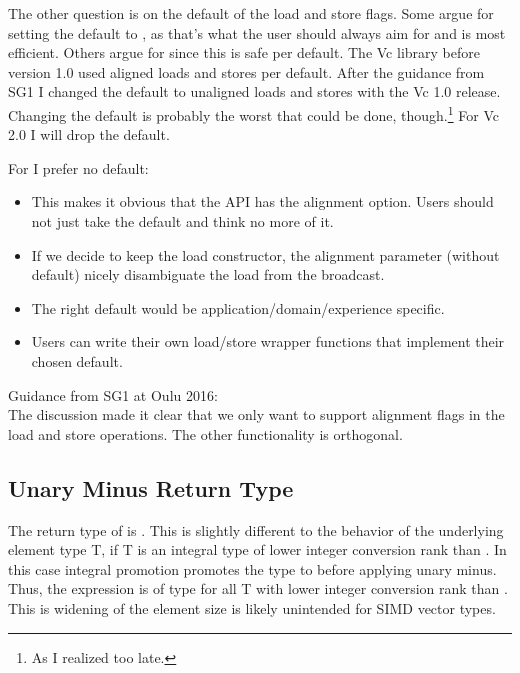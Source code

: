 The other question is on the default of the load and store flags.
Some argue for setting the default to , as that's what the user should always aim for and is most efficient.
Others argue for  since this is safe per default.
The Vc library before version 1.0 used aligned loads and stores per default.
After the guidance from SG1 I changed the default to unaligned loads and stores with the Vc 1.0 release.
Changing the default is probably the worst that could be done, though.\footnote{As I realized too late.}
For Vc 2.0 I will drop the default.

For \simd I prefer no default:
\begin{itemize}
  \item This makes it obvious that the API has the alignment option.
    Users should not just take the default and think no more of it.
  \item If we decide to keep the load constructor, the alignment parameter (without default) nicely disambiguate the load from the broadcast.
  \item The right default would be application/domain/experience specific.
  \item Users can write their own load/store wrapper functions that implement their chosen default.
\end{itemize}

Guidance from SG1 at Oulu 2016:\\
The discussion made it clear that we only want to support alignment flags in the load and store operations.
The other functionality is orthogonal.

\subsection{Unary Minus Return Type}\label{sec:unary minus}
The return type of  is .
This is slightly different to the behavior of the underlying element type \type T, if \type T is an integral type of lower integer conversion rank than \intt.
In this case integral promotion promotes the type to \intt before applying unary minus.
Thus, the expression  is of type \intt for all \type T with lower integer conversion rank than \intt.
This is widening of the element size is likely unintended for SIMD vector types.

